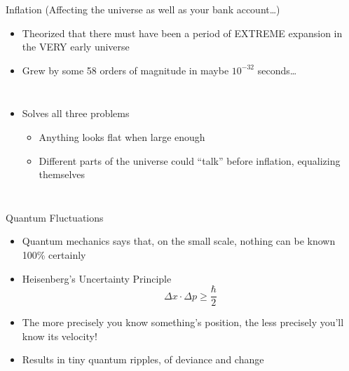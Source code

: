 \documentclass[pdf,aspectratio=169]{beamer}
\begin{document}
\begin{frame}{Inflation \scriptsize{(Affecting the universe as well as your bank account\ldots)}}
  \begin{itemize}
	\item Theorized that there must have been a period of EXTREME expansion in the VERY early universe
	\item Grew by some 58 orders of magnitude in maybe $10^{-32}$ seconds\ldots
  \end{itemize}
  \begin{columns}
	\begin{itemize}
	  \item Solves all three problems
		\begin{itemize}
		  \item Anything looks flat when large enough
		  \item Different parts of the universe could ``talk'' before inflation, equalizing themselves
		\end{itemize}
	\end{itemize}
	\begin{center}
	\end{center}
  \end{columns}
\end{frame}

\begin{frame}{Quantum Fluctuations}
  \begin{itemize}
	\item Quantum mechanics says that, on the small scale, nothing can be known 100\% certainly
	\item Heisenberg's Uncertainty Principle
	  \[\Delta x \cdot \Delta p \geq \frac{\hbar}{2}\]
	\item The more precisely you know something's position, the less precisely you'll know its velocity!
	\item Results in tiny quantum ripples, of deviance and change
  \end{itemize}
\end{frame}
\end{document}
